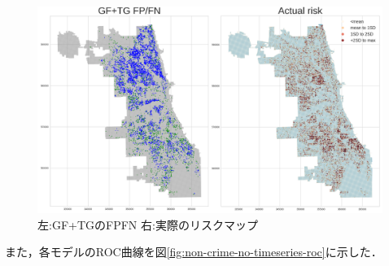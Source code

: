 \begin{figure}
  \centering %
  \includegraphics[scale=0.25]{./non-crime-no-timeseries-fig/GF+TG_fnp.png}
  \caption{左:GF+TGのFPFN 右:実際のリスクマップ}
  \label{fig:non-crime-no-timeseries-gf-tg-fnp}
\end{figure}
また，各モデルのROC曲線を図\ref{fig:non-crime-no-timeseries-roc}に示した．

